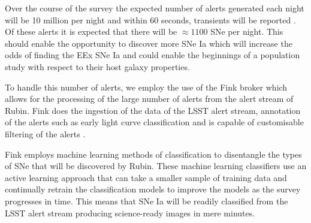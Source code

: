Over the course of the survey the expected number of alerts generated each night will be 10 million per night and within 60 seconds, transients will be reported \parencite{moller_fink_2021}. Of these alerts it is expected that there will be $\approx 1100$ SNe per night. This should enable the opportunity to discover more SNe Ia which will increase the odds of finding the EEx SNe Ia and could enable the beginnings of a population study with respect to their host galaxy properties. 

To handle this number of alerts, we employ the use of the Fink broker which allows for the processing of the large number of alerts from the alert stream of Rubin. Fink does the ingestion of the data of the LSST alert stream, annotation of the alerts such as early light curve classification and is capable of customisable filtering of the alerts \parencite{moller_fink_2021}. 

Fink employs machine learning methods of classification to disentangle the types of SNe that will be discovered by Rubin. These machine learning classifiers use an active learning approach that can take a smaller sample of training data and continually retrain the classification models to improve the models as the survey progresses in time\parencite{leoni_fink_2022}. This means that SNe Ia will be readily classified from the LSST alert stream producing science-ready images in mere minutes. 